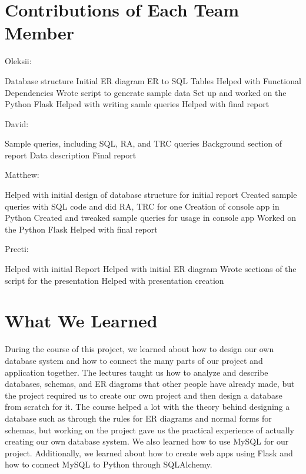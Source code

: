 \documentclass[12pt, oneside]{article}
\begin{document}
    \section{Contributions of Each Team Member}
    Oleksii:
    \begin{outline}
        \1 Database structure
        \1 Initial ER diagram
        \1 ER to SQL Tables
        \1 Helped with Functional Dependencies
        \1 Wrote script to generate sample data
        \1 Set up and worked on the Python Flask
        \1 Helped with writing samle queries
        \1 Helped with final report
    \end{outline}
    David:
    \begin{outline}
        \1 Sample queries, including SQL, RA, and TRC queries
        \1 Background section of report
        \1 Data description
        \1 Final report
    \end{outline}
    Matthew:
    \begin{outline}
        \1 Helped with initial design of database structure for initial report
        \1 Created sample queries with SQL code and did RA, TRC for one
        \1 Creation of console app in Python
        \1 Created and tweaked sample queries for usage in console app
        \1 Worked on the Python Flask
        \1 Helped with final report
    \end{outline}
    Preeti:
    \begin{outline}
        \1 Helped with initial Report
        \1 Helped with initial ER diagram
        \1 Wrote sections of the script for the presentation
        \1 Helped with presentation creation
    \end{outline}
    \section{What We Learned}
    During the course of this project, we learned about how to design our own database system and how to connect the many parts of our project and application together. The lectures taught us how to analyze and describe databases, schemas, and ER diagrams that other people have already made, but the project required us to create our own project and then design a database from scratch for it. The course helped a lot with the theory behind designing a database such as through the rules for ER diagrams and normal forms for schemas, but working on the project gave us the practical experience of actually creating our own database system. We also learned how to use MySQL for our project. Additionally, we learned about how to create web apps using Flask and how to connect MySQL to Python through SQLAlchemy.
\end{document}
